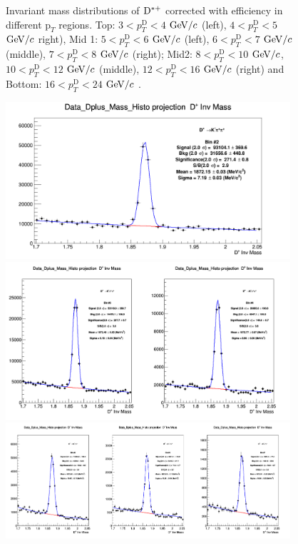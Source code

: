 \begin{figure}[!htp]
\caption{Invariant mass distributions of ${\rm D^{*+}}$ corrected with efficiency in different $\text{p}_T$ regions. Top: $3< p_{T}^{\text{D}}< 4$ $\mathrm{GeV}/c$ (left), $4< p_{T}^{\text{D}}< 5$ $\mathrm{GeV}/c$ right), Mid 1: $5< p_{T}^{\text{D}}< 6$ $\mathrm{GeV}/c$ (left), $6 < p_{T}^{\text{D}} < 7$ $\mathrm{GeV}/c$ (middle), $7< p_{T}^{\text{D}}< 8$ $\mathrm{GeV}/c$ (right); Mid2: $8< p_{T}^{\text{D}}< 10$ $\mathrm{GeV}/c$, $10< p_{T}^{\text{D}}< 12$ $\mathrm{GeV}/c$  (middle), $12 < p_{T}^{\text{D}}< 16$ $\mathrm{GeV}/c$  (right) and Bottom: $16<p_{T}^{\text{D}}< 24$ $\mathrm{GeV}/c$ .}
\label{fig:InvMassDs}
\end{figure}

\begin{figure}[h]
\centering
{\includegraphics[width=0.94\textwidth]{figures/DplusPlotsweff/InvMassDistributions_Dplus_Bins2to2.png}}
{\includegraphics[width=0.94\textwidth]{figures/DplusPlotsweff/InvMassDistributions_Dplus_Bins3to4.png}}
{\includegraphics[width=0.94\textwidth]{figures/DplusPlotsweff/InvMassDistributions_Dplus_Bins5to7.png}}
\end{figure}

